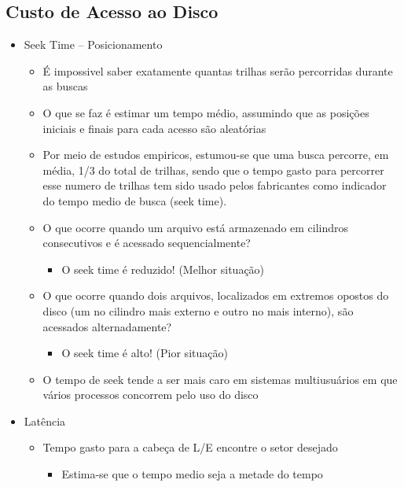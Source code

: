 \documentclass[12pt]{article}
\begin{document}
    \subsection{Custo de Acesso ao Disco}
    \begin{itemize}
        \item Seek Time -- Posicionamento
        \begin{itemize}
            \item É impossivel saber exatamente quantas trilhas serão 
            percorridas durante as buscas
            \item O que se faz é estimar um tempo médio, assumindo que as 
            posições iniciais e finais para cada acesso são aleatórias
            \item Por meio de estudos empiricos, estumou-se que uma busca 
            percorre, em média, 1/3 do total de trilhas, sendo que o tempo 
            gasto para percorrer esse numero de trilhas tem sido usado 
            pelos fabricantes como indicador do tempo medio de busca (seek 
            time).
            \item O que ocorre quando um arquivo está armazenado em 
            cilindros consecutivos e é acessado sequencialmente?
            \begin{itemize}
                \item O seek time é reduzido! (Melhor situação)
            \end{itemize}
            \item O que ocorre quando dois arquivos, localizados em
            extremos opostos do disco (um no cilindro mais externo e
            outro no mais interno), são acessados alternadamente?
            \begin{itemize}
                \item O seek time é alto! (Pior situação)
            \end{itemize}
            \item O tempo de seek tende a ser mais caro em sistemas
            multiusuários em que vários processos concorrem pelo uso do 
            disco
        \end{itemize}
        \item Latência
        \begin{itemize}
            \item Tempo gasto para a cabeça de L/E encontre o setor desejado
            \begin{itemize}
                \item Estima-se que o tempo medio seja a metade do tempo 

\end{itemize}
\end{itemize}
\end{itemize}
\end{document}
